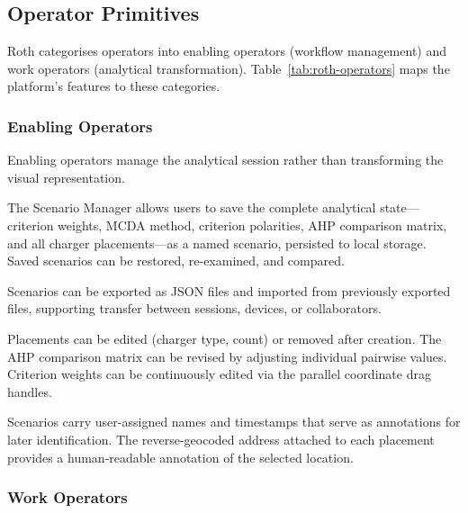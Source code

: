 \subsection{Operator Primitives}
\label{sec:roth-operators}

Roth categorises operators into enabling operators (workflow management) and work operators (analytical transformation). Table~\ref{tab:roth-operators} maps the platform's features to these categories.

\subsubsection{Enabling Operators}

Enabling operators manage the analytical session rather than transforming the visual representation.

\begin{description}[nosep, leftmargin=0pt, itemindent=0pt]
    \item[Save.] The Scenario Manager allows users to save the complete analytical state---criterion weights, MCDA method, criterion polarities, AHP comparison matrix, and all charger placements---as a named scenario, persisted to local storage. Saved scenarios can be restored, re-examined, and compared.

    \item[Export / Import.] Scenarios can be exported as JSON files and imported from previously exported files, supporting transfer between sessions, devices, or collaborators.

    \item[Edit.] Placements can be edited (charger type, count) or removed after creation. The AHP comparison matrix can be revised by adjusting individual pairwise values. Criterion weights can be continuously edited via the parallel coordinate drag handles.

    \item[Annotate.] Scenarios carry user-assigned names and timestamps that serve as annotations for later identification. The reverse-geocoded address attached to each placement provides a human-readable annotation of the selected location.
\end{description}

\subsubsection{Work Operators}

